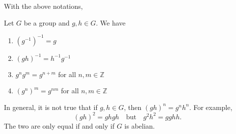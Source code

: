 With the above notations,

\begin{propo}\label{propo:group_notations}
  Let $G$ be a group and $g, h \in G$. We have 
  \begin{enumerate}
    \item $(g^{-1})^{-1} = g$
    \item $(gh)^{-1} = h^{-1} g^{-1}$
    \item $g^n g^m = g^{n + m}$ for all $n, m \in \mathbb{Z}$
    \item $(g^n)^m = g^{nm}$ for all $n, m \in \mathbb{Z}$
  \end{enumerate}
\end{propo}

\begin{warning}
  In general, it is not true that if $g, h \in G$, then $(gh)^n = g^n h^n$. For example,
  \begin{equation*}
    (gh)^2 = ghgh \quad \text{but} \quad g^2 h^2 = gghh.
  \end{equation*}
  The two are only equal if and only if $G$ is abelian.
\end{warning}



